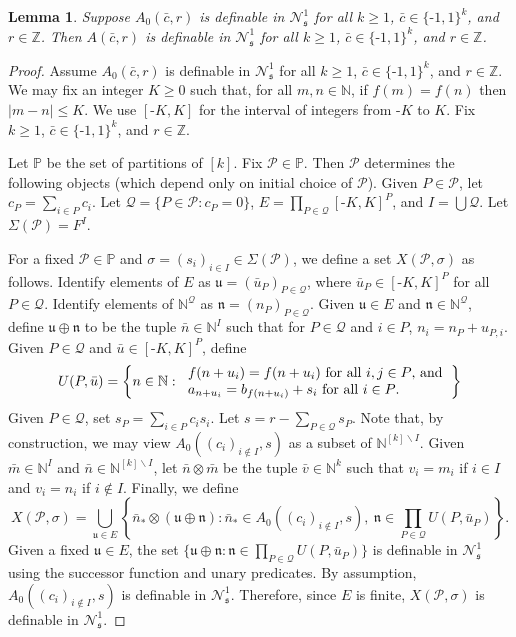 \documentclass{amsart}
\newcommand{\nv}{\text{-}}
\newcommand{\cbar}{\bar{c}}
\newcommand{\mbar}{\bar{m}}
\newcommand{\nbar}{\bar{n}}
\newcommand{\ubar}{\bar{u}}
\newcommand{\vbar}{\bar{v}}
\newcommand{\ku}{\mathfrak{u}}
\newcommand{\ms}{\mathfrak{s}}
\newcommand{\kn}{\mathfrak{n}}
\newcommand{\cN}{\mathcal{N}}
\newcommand{\cP}{\mathcal{P}}
\newcommand{\cQ}{\mathcal{Q}}
\def\N{\mathbb N}
\def\P{\mathbb P}
\def\Z{\mathbb Z}
\newtheorem{lemma}[theorem]{Lemma}
\theoremstyle{definition}
\begin{document}
\begin{lemma}\label{lem:IStech}
Suppose $A_0(\cbar,r)$ is definable in $\cN^1_{\ms}$ for all $k\geq 1$, $\cbar\in\{\nv 1,1\}^k$, and $r\in\Z$. Then $A(\cbar,r)$ is definable in $\cN^1_{\ms}$ for all $k\geq 1$, $\cbar\in\{\nv 1,1\}^k$, and $r\in\Z$.
\end{lemma}
\begin{proof}
Assume $A_0(\cbar,r)$ is definable in $\cN^1_{\ms}$ for all $k\geq 1$, $\cbar\in\{\nv 1,1\}^k$, and $r\in\Z$. We may fix an integer $K\geq 0$ such that, for all $m,n\in\N$, if $f(m)=f(n)$ then $|m-n|\leq K$. We use $[\nv K,K]$ for the interval of integers from $\nv K$ to $K$. Fix $k\geq 1$, $\cbar\in\{\nv 1,1\}^k$, and $r\in\Z$.

Let $\P$ be the set of partitions of $[k]$. Fix $\cP\in\P$. Then $\cP$ determines the following objects (which depend only on initial choice of $\cP$). Given $P\in\cP$, let $c_P=\sum_{i\in P}c_i$. Let $\cQ=\{P\in\cP:c_P=0\}$, $E=\prod_{P\in\cQ}[\nv K,K]^P$, and $I=\bigcup \cQ$. Let $\Sigma(\cP)=F^I$. 

For a fixed $\cP\in\P$ and $\sigma=(s_i)_{i\in I}\in\Sigma(\cP)$, we define a set $X(\cP,\sigma)$ as follows. Identify elements of $E$ as $\ku=(\ubar_P)_{P\in\cQ}$, where $\ubar_P\in [\nv K,K]^P$ for all $P\in\cQ$. Identify elements of $\N^{\cQ}$ as $\kn=(n_P)_{P\in\cQ}$.  Given $\ku\in E$ and $\kn\in\N^{\cQ}$, define $\ku\oplus\kn$ to be the tuple $\nbar\in\N^I$ such that for $P\in\cQ$ and $i\in P$, $n_i=n_P+u_{P,i}$. Given $P\in\cQ$ and $\ubar\in[\nv K,K]^P$, define
\[
U(P,\ubar)=\left\{n\in\N:\text{\begin{tabular}{l} $f(n+u_i)=f(n+u_i)$ for all $i,j\in P$, and\\ $a_{n+u_i}=b_{f(n+u_i)}+s_i$ for all $i\in P$.\end{tabular}}\right\}
\]
Given $P\in\cQ$, set $s_P=\sum_{i\in P}c_is_i$. Let $s=r-\sum_{P\in\cQ}s_P$. Note that, by construction, we may view $A_0((c_i)_{i\not\in I},s)$ as a subset of $\N^{[k]\backslash I}$. Given $\mbar\in \N^I$ and $\nbar\in\N^{[k]\backslash I}$, let $\nbar\otimes\mbar$ be the tuple $\vbar\in\N^k$ such that $v_i=m_i$ if $i\in I$ and $v_i=n_i$ if $i\not\in I$. Finally, we define
\[
X(\cP,\sigma)=\bigcup_{\ku\in E}\left\{\nbar_*\otimes (\ku\oplus\kn):\nbar_*\in A_0((c_i)_{i\not\in I},s),~\kn\in\prod_{P\in\cQ}U(P,\ubar_P)\right\}.
\]
Given a fixed $\ku\in E$, the set $\{\ku\oplus\kn:\kn\in\prod_{P\in \cQ}U(P,\ubar_P)\}$ is definable in $\cN^1_{\ms}$ using the successor function and unary predicates. By assumption, $A_0((c_i)_{i\not\in I},s)$ is definable in $\cN^1_{\ms}$. Therefore, since $E$ is finite, $X(\cP,\sigma)$ is definable in $\cN^1_{\ms}$. 


\end{proof}
\end{document}
